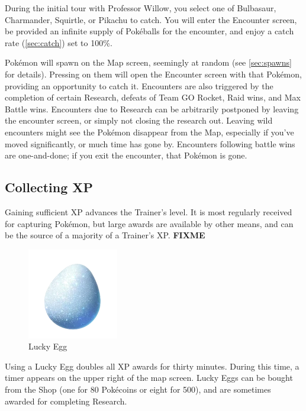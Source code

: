 During the initial tour with Professor Willow, you select one of
 Bulbasaur, Charmander, Squirtle, or Pikachu to catch.
You will enter the Encounter screen, be provided an infinite supply of
  Pokéballs for the encounter, and enjoy a catch rate (\autoref{sec:catch}) set to 100\%.

Pokémon will spawn on the Map screen, seemingly at random (see \autoref{sec:spawns} for details).
Pressing on them will open the Encounter screen with that Pokémon,
  providing an opportunity to catch it.
Encounters are also triggered by the completion of certain Research,
  defeats of Team GO Rocket, Raid wins, and Max Battle wins.
Encounters due to Research can be arbitrarily postponed by leaving the encounter screen,
  or simply not closing the research out.
Leaving wild encounters might see the Pokémon disappear from the Map, especially
  if you've moved significantly, or much time has gone by.
Encounters following battle wins are one-and-done; if you exit the encounter,
  that Pokémon is gone.

\subsection{Collecting XP}
\label{subsec:getxp}
Gaining sufficient XP advances the Trainer's level.
It is most regularly received for capturing Pokémon, but large awards are
  available by other means, and can be the source of a majority of a Trainer's XP.
  \textbf{FIXME}
\begin{figure}
  \center
  \includegraphics[scale=.5]{images/luckyegg.png}
  \caption{Lucky Egg}
\end{figure}
Using a Lucky Egg doubles all XP awards for thirty minutes.
During this time, a timer appears on the upper right of the map screen.
Lucky Eggs can be bought from the Shop (one for 80 Pokécoins or eight for 500),
  and are sometimes awarded for completing Research.


